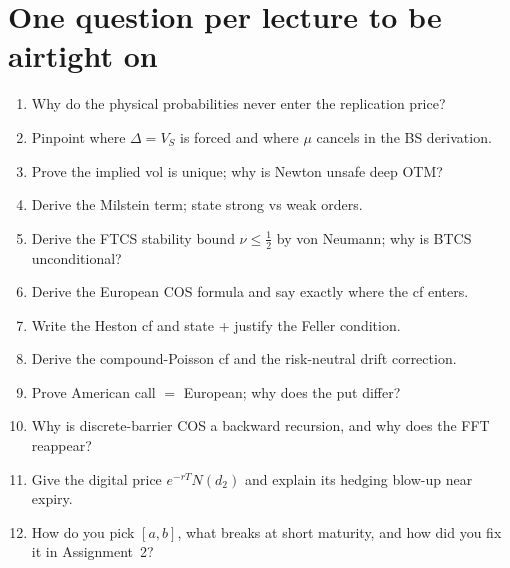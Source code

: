 \documentclass[11pt]{article}
\begin{document}
\section{One question per lecture to be airtight on}
\begin{enumerate}
  \item[L1.] Why do the physical probabilities never enter the replication price?
  \item[L2.] Pinpoint where $\Delta=V_S$ is forced and where $\mu$ cancels in the BS derivation.
  \item[L3.] Prove the implied vol is unique; why is Newton unsafe deep OTM?
  \item[L4.] Derive the Milstein term; state strong vs weak orders.
  \item[L5.] Derive the FTCS stability bound $\nu\le\tfrac12$ by von Neumann; why is BTCS unconditional?
  \item[L6.] Derive the European COS formula and say exactly where the cf enters.
  \item[L7.] Write the Heston cf and state + justify the Feller condition.
  \item[L8.] Derive the compound-Poisson cf and the risk-neutral drift correction.
  \item[L9.] Prove American call $=$ European; why does the put differ?
  \item[L10.] Why is discrete-barrier COS a backward recursion, and why does the FFT reappear?
  \item[L11.] Give the digital price $e^{-rT}N(d_2)$ and explain its hedging blow-up near expiry.
  \item[COS.] How do you pick $[a,b]$, what breaks at short maturity, and how did you fix it in Assignment~2?
\end{enumerate}
\end{document}
